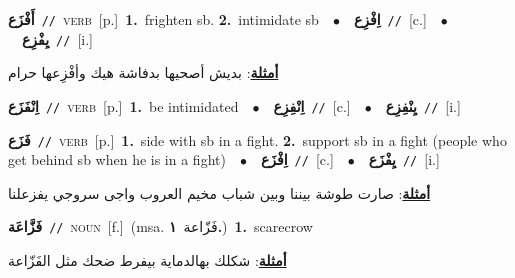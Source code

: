 \documentclass[10pt,a4paper,twoside]{article} %
\begin{document}
\begin{multicols}{2}
{\setlength\topsep{0pt}\textbf{\foreignlanguage{arabic}{أَفْزَع}}\ {\color{gray}\texttt{//}\color{black}}\ \textsc{verb}\ [p.]\ \textbf{1.}~frighten sb.  \textbf{2.}~intimidate sb\ \ $\bullet$\ \ \setlength\topsep{0pt}\textbf{\foreignlanguage{arabic}{اِفْزِع}}\ {\color{gray}\texttt{//}\color{black}}\ [c.]\ \ $\bullet$\ \ \setlength\topsep{0pt}\textbf{\foreignlanguage{arabic}{يِفْزِع}}\ {\color{gray}\texttt{//}\color{black}}\ [i.]\  \begin{flushright}\color{gray}\foreignlanguage{arabic}{\textbf{\underline{\foreignlanguage{arabic}{أمثلة}}}: بديش أصحيها بدفاشة هيك وأفْزِعها   حرام}\end{flushright}\color{black}} \vspace{2mm}

{\setlength\topsep{0pt}\textbf{\foreignlanguage{arabic}{اِنْفَزَع}}\ {\color{gray}\texttt{//}\color{black}}\ \textsc{verb}\ [p.]\ \textbf{1.}~be intimidated\ \ $\bullet$\ \ \setlength\topsep{0pt}\textbf{\foreignlanguage{arabic}{اِنْفِزِع}}\ {\color{gray}\texttt{//}\color{black}}\ [c.]\ \ $\bullet$\ \ \setlength\topsep{0pt}\textbf{\foreignlanguage{arabic}{يِنْفِزِع}}\ {\color{gray}\texttt{//}\color{black}}\ [i.]\ } \vspace{2mm}

{\setlength\topsep{0pt}\textbf{\foreignlanguage{arabic}{فَزَع}}\ {\color{gray}\texttt{//}\color{black}}\ \textsc{verb}\ [p.]\ \textbf{1.}~side with sb in a fight.  \textbf{2.}~support sb in a fight (people who get behind sb when he is in a fight)\ \ $\bullet$\ \ \setlength\topsep{0pt}\textbf{\foreignlanguage{arabic}{اِفْزَع}}\ {\color{gray}\texttt{//}\color{black}}\ [c.]\ \ $\bullet$\ \ \setlength\topsep{0pt}\textbf{\foreignlanguage{arabic}{يِفْزَع}}\ {\color{gray}\texttt{//}\color{black}}\ [i.]\  \begin{flushright}\color{gray}\foreignlanguage{arabic}{\textbf{\underline{\foreignlanguage{arabic}{أمثلة}}}: صارت طوشة بيننا وبين شباب مخيم العروب واجى سروجي يفزعلنا}\end{flushright}\color{black}} \vspace{2mm}

{\setlength\topsep{0pt}\textbf{\foreignlanguage{arabic}{فَزَّاعَة}}\ {\color{gray}\texttt{//}\color{black}}\ \textsc{noun}\ [f.]\ \color{gray}(msa. \foreignlanguage{arabic}{فَزّاعة}~\foreignlanguage{arabic}{\textbf{١.}})\color{black}\ \textbf{1.}~scarecrow\  \begin{flushright}\color{gray}\foreignlanguage{arabic}{\textbf{\underline{\foreignlanguage{arabic}{أمثلة}}}: شكلك بهالدماية بيفرط ضحك مثل الفَزّاعة}\end{flushright}\color{black}} \vspace{2mm}


\end{multicols}
\end{document}

